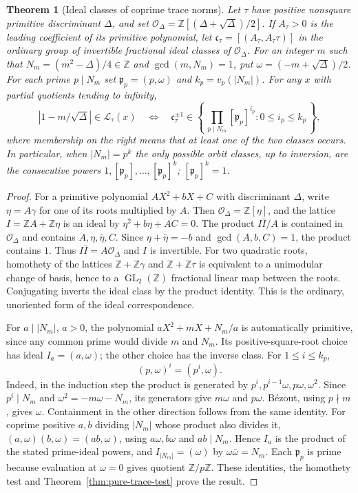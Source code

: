 \documentclass[11pt]{amsart}
\newtheorem{theorem}{Theorem}[section]
\theoremstyle{definition}
\theoremstyle{remark}
\numberwithin{equation}{section}
\newcommand{\Z}{\mathbb{Z}}
\begin{document}
\begin{theorem}[Ideal classes of coprime trace norms]\label{thm:trace-class-sieve}
Let $\tau$ have positive nonsquare primitive discriminant $\Delta$,
and set
$\mathcal O_\Delta=\Z[(\Delta+\sqrt\Delta)/2]$. If $A_\tau>0$ is the
leading coefficient of its primitive polynomial, let
$\mathfrak c_\tau=[(A_\tau,A_\tau\tau)]$ in the ordinary group of
invertible fractional ideal classes of $\mathcal O_\Delta$.
For an integer $m$ such that $N_m=(m^2-\Delta)/4\in\Z$ and
$\gcd(m,N_m)=1$, put $\omega=(-m+\sqrt\Delta)/2$. For each prime
$p\mid N_m$ set $\mathfrak p_p=(p,\omega)$ and $k_p=v_p(|N_m|)$.
For any $x$ with partial quotients tending to infinity,
\begin{equation}\label{eq:trace-class-sieve}
 |1-m/\sqrt\Delta|\in\mathcal L_\tau(x)
 \quad\Longleftrightarrow\quad
 \mathfrak c_\tau^{\pm1}\in
 \left\{\,\prod_{p\mid N_m}[\mathfrak p_p]^{i_p}:
                    0\le i_p\le k_p\,\right\},
\end{equation}
where membership on the right means that at least one of the two
classes occurs. In particular, when $|N_m|=p^k$ the only possible
orbit classes, up to inversion, are the consecutive powers
$1,[\mathfrak p_p],\ldots,[\mathfrak p_p]^k$;
$[\mathfrak p_p]^k=1$.
\end{theorem}
\begin{proof}
For a primitive polynomial $AX^2+bX+C$ with discriminant
$\Delta$, write $\eta=A\gamma$ for one of its roots multiplied by
$A$. Then $\mathcal O_\Delta=\Z[\eta]$, and the lattice
$I=\Z A+\Z\eta$ is an ideal by $\eta^2+b\eta+AC=0$.
The product $I\bar I/A$ is contained in $\mathcal O_\Delta$ and
contains $A,\eta,\bar\eta,C$. Since
$\eta+\bar\eta=-b$ and $\gcd(A,b,C)=1$, the product contains $1$.
Thus $I\bar I=A\mathcal O_\Delta$ and $I$ is invertible.
For two quadratic roots, homothety of the lattices
$\Z+\Z\gamma$ and $\Z+\Z\tau$ is equivalent to a unimodular
change of basis, hence to a $\operatorname{GL}_2(\Z)$ fractional
linear map between the roots. Conjugating inverts the ideal class
by the product identity. This is the ordinary, unoriented form of
the ideal correspondence.

For $a\mid |N_m|$, $a>0$, the polynomial
$aX^2+mX+N_m/a$ is automatically primitive, since any common prime
would divide $m$ and $N_m$. Its positive-square-root choice
has ideal $I_a=(a,\omega)$; the other choice has the inverse class.
For $1\le i\le k_p$,
\[
 (p,\omega)^i=(p^i,\omega).
\]
Indeed, in the induction step the product is generated by
$p^i,p^{i-1}\omega,p\omega,\omega^2$.
Since $p^i\mid N_m$ and $\omega^2=-m\omega-N_m$, its generators
give $m\omega$ and $p\omega$. B\'ezout, using $p\nmid m$, gives
$\omega$. Containment in the other direction follows from the same
identity. For coprime positive $a,b$ dividing $|N_m|$ whose product
also divides it,
$(a,\omega)(b,\omega)=(ab,\omega)$, using $a\omega,b\omega$
and $ab\mid N_m$. Hence $I_a$ is the product of the stated
prime-ideal powers, and $I_{|N_m|}=(\omega)$ by
$\omega\bar\omega=N_m$. Each $\mathfrak p_p$ is prime because
evaluation at $\omega=0$ gives quotient $\Z/p\Z$.
These identities, the homothety test and
Theorem~\ref{thm:pure-trace-test} prove the result.
\end{proof}
\end{document}
